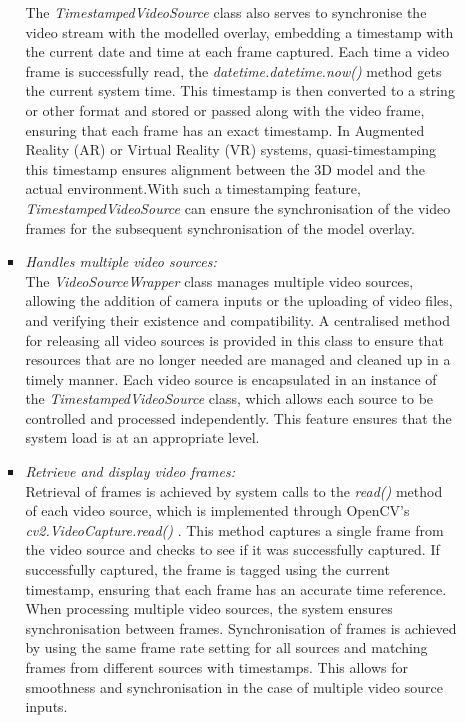 \documentclass[12pt]{article}
\begin{document}
\begin{enumerate}
\begin{enumerate}
\begin{itemize}
                                    The \emph{TimestampedVideoSource} class also serves to synchronise the video stream with the modelled overlay, embedding a timestamp with the current date and time at each frame captured. Each time a video frame is successfully read, the \emph{datetime.datetime.now()} method gets the current system time. This timestamp is then converted to a string or other format and stored or passed along with the video frame, ensuring that each frame has an exact timestamp. In Augmented Reality (AR) or Virtual Reality (VR) systems, quasi-timestamping this timestamp ensures alignment between the 3D model and the actual environment.With such a timestamping feature, \emph{TimestampedVideoSource} can ensure the synchronisation of the video frames for the subsequent synchronisation of the model overlay.
                              \item \textit{Handles multiple video sources:}
                                    \\
                                    The \emph{VideoSourceWrapper} class manages multiple video sources, allowing the addition of camera inputs or the uploading of video files, and verifying their existence and compatibility. A centralised method for releasing all video sources is provided in this class to ensure that resources that are no longer needed are managed and cleaned up in a timely manner. Each video source is encapsulated in an instance of the \emph{TimestampedVideoSource } class, which allows each source to be controlled and processed independently. This feature ensures that the system load is at an appropriate level.
                              \item \textit{Retrieve and display video frames:}
                                    \\
                                    Retrieval of frames is achieved by system calls to the \emph{read()} method of each video source, which is implemented through OpenCV's \emph{ cv2.VideoCapture.read() }. This method captures a single frame from the video source and checks to see if it was successfully captured. If successfully captured, the frame is tagged using the current timestamp, ensuring that each frame has an accurate time reference. When processing multiple video sources, the system ensures synchronisation between frames. Synchronisation of frames is achieved by using the same frame rate setting for all sources and matching frames from different sources with timestamps. This allows for smoothness and synchronisation in the case of multiple video source inputs.
                        \end{itemize}


\end{enumerate}
\end{enumerate}
\end{document}
